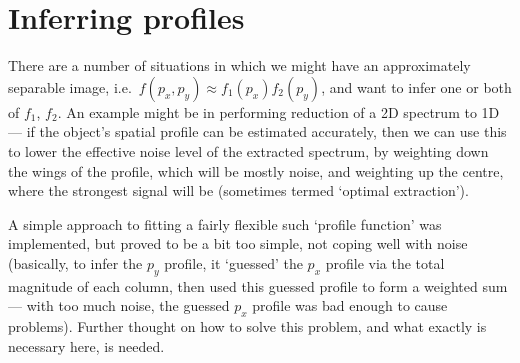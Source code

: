\section{Inferring profiles}
\label{sec:profileInference}

There are a number of situations in which we might have an approximately
separable image, i.e.\ $f(p_x, p_y) \approx f_1(p_x)f_2(p_y)$, and want
to infer one or both of $f_1$, $f_2$. An example might be in performing
reduction of a 2D spectrum to 1D --- if the object's spatial profile can
be estimated accurately, then we can use this to lower the effective
noise level of the extracted spectrum, by weighting down the wings of
the profile, which will be mostly noise, and weighting up the centre,
where the strongest signal will be (sometimes termed `optimal extraction').

A simple approach to fitting a fairly flexible such `profile function'
was implemented, but proved to be a bit too simple, not coping well
with noise (basically, to infer the $p_y$ profile, it `guessed' the
$p_x$ profile via the total magnitude of each column, then used this
guessed profile to form a weighted sum --- with too much noise, the
guessed $p_x$ profile was bad enough to cause problems). Further thought
on how to solve this problem, and what exactly is necessary here,
is needed.
